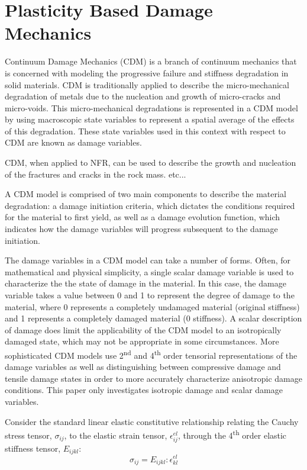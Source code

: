 \section{Plasticity Based Damage Mechanics}

Continuum Damage Mechanics (CDM) is a branch of continuum mechanics that is concerned with modeling the progressive failure and stiffness degradation in solid materials. CDM is traditionally applied to describe the micro-mechanical degradation of metals due to the nucleation and growth of micro-cracks and micro-voids. This micro-mechanical degradations is represented in a CDM model by using macroscopic state variables to represent a spatial average of the effects of this degradation. These state variables used in this context with respect to CDM are known as damage variables. 

CDM, when applied to NFR, can be used to describe the growth and nucleation of the fractures and cracks in the rock mass. etc...

A CDM model is comprised of two main components to describe the material degradation: a damage initiation criteria, which dictates the conditions required for the material to first yield, as well as a damage evolution function, which indicates how the damage variables will progress subsequent to the damage initiation. 

The damage variables in a CDM model can take a number of forms. Often, for mathematical and physical simplicity, a single scalar damage variable is used to characterize the the state of damage in the material. In this case, the damage variable takes a value between 0 and 1 to represent the degree of damage to the material, where 0 represents a completely undamaged material (original stiffness) and 1 represents a completely damaged material (0 stiffness). A scalar description of damage does limit the applicability of the CDM model to an isotropically damaged state, which may not be appropriate in some circumstances. More sophisticated CDM models use 2\textsuperscript{nd} and 4\textsuperscript{th} order tensorial representations of the damage variables as well as distinguishing between compressive damage and tensile damage states in order to more accurately characterize anisotropic damage conditions. This paper only investigates isotropic damage and scalar damage variables. 

Consider the standard linear elastic constitutive relationship relating the Cauchy stress tensor, $\sigma_{ij}$, to the elastic strain tensor, $\epsilon^{el}_{ij}$, through the 4\textsuperscript{th} order elastic stiffness tensor, $E_{ijkl}$:
\begin{equation}
\sigma_{ij} =E_{ijkl}:\epsilon^{el}_{kl}
\label{eqn:const3a}
\end{equation}

